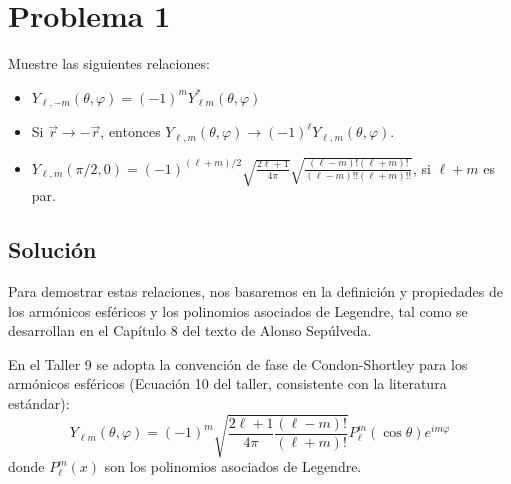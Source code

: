 \documentclass[a4paper]{article}
\begin{document}
\section{Problema 1}
Muestre las siguientes relaciones:
\begin{itemize}
    \item[a)] $Y_{\ell,-m}(\theta, \varphi)=(-1)^m Y^*_{\ell m}(\theta, \varphi)$
    \item[b)] Si $\vec{r} \to -\vec{r}$, entonces $Y_{\ell,m}(\theta, \varphi) \to (-1)^\ell Y_{\ell,m}(\theta, \varphi)$.
    \item[c)] $Y_{\ell,m}(\pi/2, 0)=(-1)^{(\ell+m)/2}\sqrt{\frac{2\ell+1}{4\pi}} \sqrt{\frac{(\ell-m)!(\ell+m)!}{(\ell-m)!!(\ell+m)!!}}$, si $\ell+m$ es par.
\end{itemize}

\subsection{Solución}
Para demostrar estas relaciones, nos basaremos en la definición y propiedades de los armónicos esféricos y los polinomios asociados de Legendre, tal como se desarrollan en el Capítulo 8 del texto de Alonso Sepúlveda. 

En el Taller 9 se adopta la convención de fase de Condon-Shortley para los armónicos esféricos (Ecuación 10 del taller, consistente con la literatura estándar):
$$
Y_{\ell m}(\theta, \varphi) = (-1)^m \sqrt{\frac{2\ell+1}{4\pi} \frac{(\ell-m)!}{(\ell+m)!}} P_\ell^m(\cos\theta) e^{im\varphi}
$$
donde $P_\ell^m(x)$ son los polinomios asociados de Legendre.
\end{document}
